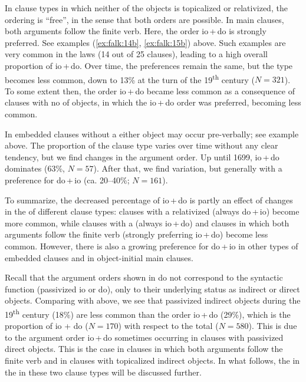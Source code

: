 \documentclass[output=paper]{langscibook}
\begin{document}
In clause types in which neither of the objects is topicalized or relativized, the ordering is “free”, in the sense that both orders are possible. In main clauses, both arguments follow the finite verb. Here, the order io\,+\,do is strongly preferred. See examples (\ref{ex:falk:14b}, \ref{ex:falk:15b}) above. Such examples are very common in the laws (14 out of 25 clauses), leading to a high overall proportion of io\,+\,do. Over time, the preferences remain the same, but the type becomes less common, down to 13\% at the turn of the 19\textsuperscript{th} century ($N = 321$). To some extent then, the order io\,+\,do became less common as a consequence of clauses with no  of objects, in which the io\,+\,do order was preferred, becoming less common.



In embedded clauses without a  either object may occur pre-verbally; see example  above. The proportion of the clause type varies over time without any clear tendency, but we find changes in the argument order. Up until 1699, io\,+\,do dominates (63\%, $N = 57$). After that, we find variation, but generally with a preference for do\,+\,io (ca. 20–40\%; $N = 161$).



To summarize, the decreased percentage of io\,+\,do is partly an effect of changes in the  of different clause types: clauses with a relativized  (always do\,+\,io) become more common, while clauses with a  (always io\,+\,do) and clauses in which both arguments follow the finite verb (strongly preferring io\,+\,do) become less common. However, there is also a growing preference for do\,+\,io in other types of embedded clauses and in object-initial main clauses.



Recall that the argument orders shown in  do not correspond to the syntactic function (passivized io or do), only to their underlying status as indirect or direct objects. Comparing with  above, we see that passivized indirect objects during the 19\textsuperscript{th} century (18\%) are less common than the order io\,+\,do (29\%), which is the proportion of  io + do ($N=170$) with respect to the total ($N=580$). This is due to the argument order io\,+\,do sometimes occurring in clauses with passivized direct objects. This is the case in clauses in which both arguments follow the finite verb and in clauses with topicalized indirect objects. In what follows, the  in the  in these two clause types will be discussed further.
\end{document}
